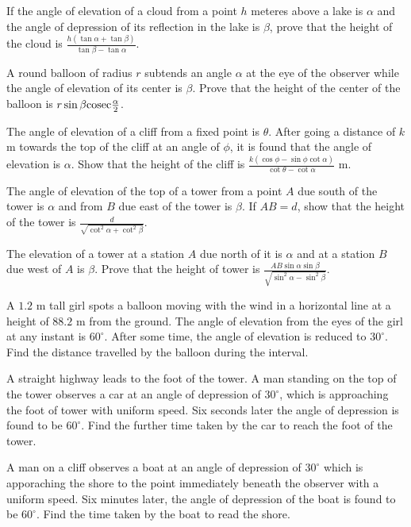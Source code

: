 \item If the angle of elevation of a cloud from a point $h$ meteres above a lake is $\alpha$ and the angle of depression
  of its reflection in the lake is $\beta$, prove that the height of the cloud is $\frac{h(\tan\alpha +
    \tan\beta)}{\tan\beta - \tan\alpha}$.

\item A round balloon of radius $r$ subtends an angle $\alpha$ at the eye of the observer while the angle of elevation of
  its center is $\beta$. Prove that the height of the center of the balloon is $r\sin\beta\rm cosec\frac{\alpha}{2}$.

\item The angle of elevation of a cliff from a fixed point is $\theta$. After going a distance of $k$ m towards the top
  of the cliff at an angle of $\phi$, it is found that the angle of elevation is $\alpha$. Show that the height of
  the cliff is $\frac{k(\cos\phi - \sin\phi\cot\alpha)}{\cot\theta - \cot\alpha}$ m.

\item The angle of elevation of the top of a tower from a point $A$ due south of the tower is $\alpha$ and from $B$
  due east of the tower is $\beta$. If $AB = d$, show that the height of the tower is
  $\frac{d}{\sqrt{\cot^2\alpha + \cot^2\beta}}$.

\item The elevation of a tower at a station $A$ due north of it is $\alpha$ and at a station $B$ due west of
  $A$ is $\beta$. Prove that the height of tower is $\frac{AB\sin\alpha\sin\beta}{\sqrt{\sin^2\alpha -
    \sin^2\beta}}$.

\item A $1.2$ m tall girl spots a balloon moving with the wind in a horizontal line at a height of $88.2$ m from the
  ground. The angle of elevation from the eyes of the girl at any instant is $60^\circ$. After some time, the angle of
  elevation is reduced to $30^\circ$. Find the distance travelled by the balloon during the interval.

\item A straight highway leads to the foot of the tower. A man standing on the top of the tower observes a car at an angle of
  depression of $30^\circ$, which is approaching the foot of tower with uniform speed. Six seconds later the angle of
  depression is found to be $60^\circ$. Find the further time taken by the car to reach the foot of the tower.

\item A man on a cliff observes a boat at an angle of depression of $30^\circ$ which is apporaching the shore to the point
  immediately beneath the observer with a uniform speed. Six minutes later, the angle of depression of the boat is found to be
  $60^\circ$. Find the time taken by the boat to read the shore.

